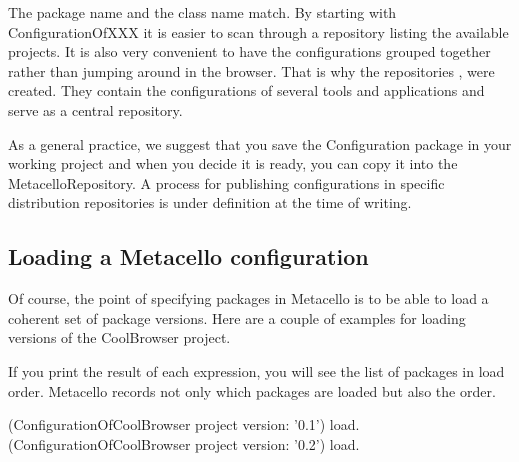 \documentclass[a4paper,10pt,twoside]{book}
\begin{document}
The package name and the class name match. By starting with ConfigurationOfXXX it is easier to scan through a repository listing the available projects. It is also very convenient to have the configurations grouped together rather than jumping around in the browser. That is why the repositories ,  were created. They contain the configurations of several tools and applications and serve as a central repository. 


As a general practice, we suggest that you save the Configuration package in your working project and when you decide it is ready, you can copy it into the MetacelloRepository. A process for publishing configurations in specific distribution repositories is under definition at the time of writing.



\subsection{Loading a Metacello configuration}
Of course, the point of specifying packages in Metacello is to be able to load a coherent set of package versions. Here are a couple of examples for loading versions of the CoolBrowser project. 

If you print the result of each expression, you will see the list of packages in load order. Metacello records not only which packages are loaded but also the order. 

\begin{code}{}
  (ConfigurationOfCoolBrowser project version: '0.1') load.
  (ConfigurationOfCoolBrowser project version: '0.2') load.
\end{code}
  
\end{document}
